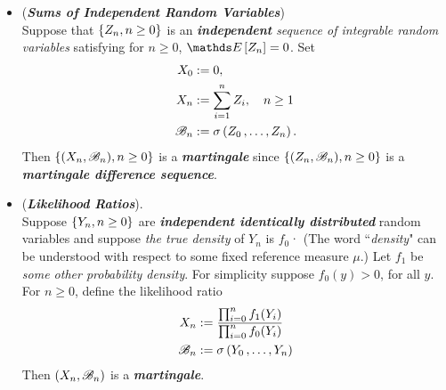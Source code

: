 \documentclass[11pt]{article}
\begin{document}
\begin{itemize}
\item \begin{example}(\emph{\textbf{Sums of Independent Random Variables}}) \\
Suppose that $\left\{Z_n, n \ge 0\right\}$ is an \emph{\textbf{independent} sequence of integrable random variables} satisfying for $n \ge 0$, 
$\E{}{Z_n} = 0$.  Set
\begin{align*}
X_0 &:= 0,\\
X_n &:= \sum_{i=1}^{n}Z_i, \quad n \ge 1 \\
{\mathscr B}_n &:= \sigma\left(Z_0 \,{,}\ldots{,}\, Z_n\right).
\end{align*} Then $\left\{(X_n, {\mathscr B}_n), n \ge 0\right\}$ is a \emph{\textbf{martingale}} since $\left\{(Z_n, {\mathscr B}_n), n \ge 0\right\}$ is a \emph{\textbf{martingale difference sequence}}.
\end{example}

\item \begin{example} (\emph{\textbf{Likelihood Ratios}}).\\ 
Suppose $\left\{Y_n, n \ge 0\right\}$ are \emph{\textbf{independent identically distributed}} random variables and suppose \emph{the true density} of $Y_n$ is $f_0$· (The word ``\emph{density}" can be understood with respect to some fixed reference measure $\mu$.)  Let $f_1$ be \emph{some other probability density}. For simplicity suppose $f_0(y) > 0$, for all $y$.  For $n \ge 0$, define the likelihood ratio
\begin{align*}
X_n &:= \frac{\prod_{i=0}^{n}f_1(Y_i)}{\prod_{i=0}^{n}f_0(Y_i)}\\
{\mathscr B}_n &:= \sigma\left(Y_0 \,{,}\ldots{,}\, Y_n\right)
\end{align*} Then $(X_n, {\mathscr B}_n)$ is a \emph{\textbf{martingale}}.
\end{example}
\end{itemize}
\end{document}
